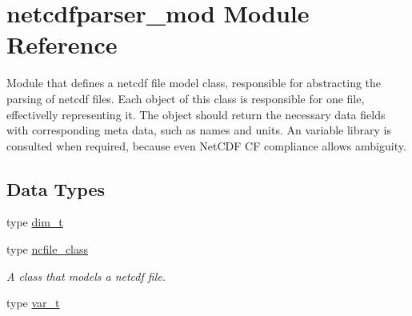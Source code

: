 \hypertarget{namespacenetcdfparser__mod}{}\section{netcdfparser\+\_\+mod Module Reference}
\label{namespacenetcdfparser__mod}


Module that defines a netcdf file model class, responsible for abstracting the parsing of netcdf files. Each object of this class is responsible for one file, effectivelly representing it. The object should return the necessary data fields with corresponding meta data, such as names and units. An variable library is consulted when required, because even Net\+C\+DF CF compliance allows ambiguity.  


\subsection*{Data Types}
\begin{DoxyCompactItemize}
\item 
type \mbox{\hyperlink{structnetcdfparser__mod_1_1dim__t}{dim\+\_\+t}}
\item 
type \mbox{\hyperlink{structnetcdfparser__mod_1_1ncfile__class}{ncfile\+\_\+class}}
\begin{DoxyCompactList}\small\item\em A class that models a netcdf file. \end{DoxyCompactList}\item 
type \mbox{\hyperlink{structnetcdfparser__mod_1_1var__t}{var\+\_\+t}}
\end{DoxyCompactItemize}
